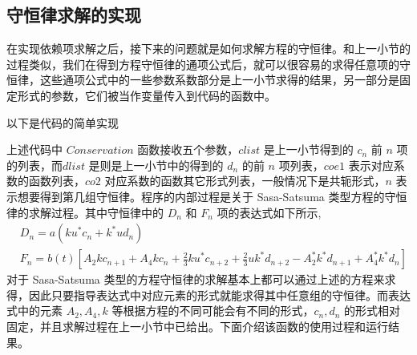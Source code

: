 \subsection{守恒律求解的实现}
在实现依赖项求解之后，接下来的问题就是如何求解方程的守恒律。和上一小节的过程类似，我们在得到方程守恒律的通项公式后，就可以很容易的求得任意项的守恒律，这些通项公式中的一些参数系数部分是上一小节求得的结果，另一部分是固定形式的参数，它们被当作变量传入到代码的函数中。

以下是代码的简单实现

上述代码中 $Conservation$ 函数接收五个参数，$clist$ 是上一小节得到的 $c_n$ 前 $n$ 项的列表，而$dlist$ 是则是上一小节中的得到的 $d_n$ 的前 $n$ 项列表，$coe1$ 表示对应系数的函数列表，$co2$ 对应系数的函数其它形式列表，一般情况下是共轭形式，$n$ 表示想要得到第几组守恒律。程序的内部过程是关于 Sasa-Satsuma 类型方程的守恒律的求解过程。其中守恒律中的 $D_n$ 和 $F_n$ 项的表达式如下所示,
\begin{align}
  & D_{n} = a(ku^{*}c_{n} + k^{*}ud_{n}) \\
  & F_{n} = b(t)\left[A_{2}kc_{n+1} + A_{4}kc_{n} + \frac{2}{3}ku^{*}c_{n+2} + \frac{2}{3}uk^{*}d_{n+2} - A_{2}^{*}k^{*}d_{n+1} + A_{4}^{*}k^{*}d_{n}\right]
\end{align}
对于 Sasa-Satsuma 类型的方程守恒律的求解基本上都可以通过上述的方程来求得，因此只要指导表达式中对应元素的形式就能求得其中任意组的守恒律。而表达式中的元素 $A_2, A_4, k$ 等根据方程的不同可能会有不同的形式，$c_n, d_n$ 的形式相对固定，并且求解过程在上一小节中已给出。下面介绍该函数的使用过程和运行结果。


